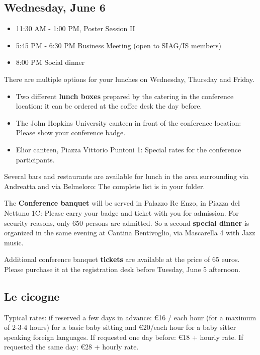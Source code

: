 \subsection*{Wednesday, June 6}

\begin{itemize}
  \item[] 11:30 AM - 1:00 PM, Poster Session II
  \item[] 5:45 PM - 6:30 PM Business Meeting (open to SIAG/IS members)
  \item[] 8:00 PM Social dinner
\end{itemize}

\newpage %
There are multiple options for your lunches on Wednesday, Thursday and Friday. 
\bigskip
\begin{itemize}
  \item Two different \textbf{lunch boxes} prepared by the catering in the conference location: it can be ordered at the coffee desk the day before.
  \item The John Hopkins University canteen in front of the conference location: Please show your conference badge.
  \item Elior canteen, Piazza Vittorio Puntoni 1: Special rates for the conference participants.
\end{itemize}
\bigskip
Several bars and restaurants are available for lunch in the area surrounding via Andreatta and via Belmeloro: The complete list is in your folder.

The \textbf{Conference banquet} will be served in Palazzo Re Enzo, in Piazza del Nettuno 1C: Please carry your badge and ticket with you for admission. For security
reasons, only 650 persons are admitted. So a second \textbf{special dinner} is organized in the same evening at Cantina Bentivoglio, via Mascarella 4 with 
Jazz music.

\bigskip 

\noindent Additional conference banquet \textbf{tickets} are available at the price of 65 euros. 
Please purchase it at the registration desk before Tuesday, June 5 afternoon.\\

\subsection*{Le cicogne} 
Typical rates: if reserved a few days in advance: \euro 16 / each hour (for a maximum of 2-3-4 hours) for a basic baby sitting and \euro 20/each hour for a baby sitter speaking foreign languages.
If requested one day before: \euro 18 + hourly rate.
If requested the same day: \euro 28 + hourly rate.

